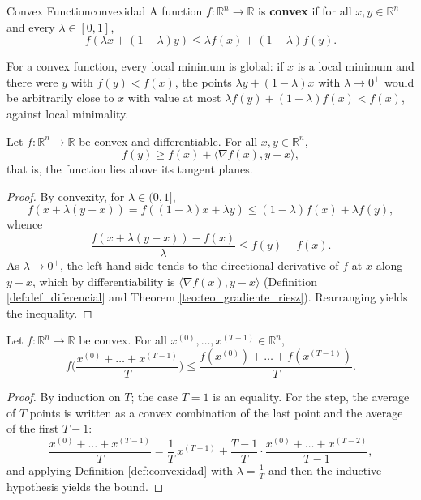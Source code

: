 \documentclass[11pt, a4paper]{article}
\begin{document}
\begin{definicion}{Convex Function}{convexidad}
A function $f: \mathbb{R}^n \to \mathbb{R}$ is \textbf{convex} if for all $x, y \in \mathbb{R}^n$ and every $\lambda \in [0, 1]$,
\[
f(\lambda x + (1 - \lambda) y) \le \lambda f(x) + (1 - \lambda) f(y).
\]
\end{definicion}

\obs For a convex function, every local minimum is global: if $x$ is a local minimum and there were $y$ with $f(y) < f(x)$, the points $\lambda y + (1-\lambda) x$ with $\lambda \to 0^+$ would be arbitrarily close to $x$ with value at most $\lambda f(y) + (1-\lambda) f(x) < f(x)$, against local minimality.

\begin{lema}\label{lem_tangente}
Let $f: \mathbb{R}^n \to \mathbb{R}$ be convex and differentiable. For all $x, y \in \mathbb{R}^n$,
\[
f(y) \ge f(x) + \langle \nabla f(x), y - x \rangle,
\]
that is, the function lies above its tangent planes.
\end{lema}

\begin{proof}
By convexity, for $\lambda \in (0, 1]$,
\[
f(x + \lambda (y - x)) = f((1-\lambda) x + \lambda y) \le (1 - \lambda) f(x) + \lambda f(y),
\]
whence
\[
\frac{f(x + \lambda (y - x)) - f(x)}{\lambda} \le f(y) - f(x).
\]
As $\lambda \to 0^+$, the left-hand side tends to the directional derivative of $f$ at $x$ along $y - x$, which by differentiability is $\langle \nabla f(x), y - x \rangle$ (Definition \ref{def:def_diferencial} and Theorem \ref{teo:teo_gradiente_riesz}). Rearranging yields the inequality.
\end{proof}

\begin{lema}\label{lem_jensen}
Let $f: \mathbb{R}^n \to \mathbb{R}$ be convex. For all $x^{(0)}, \dots, x^{(T-1)} \in \mathbb{R}^n$,
\[
f \Bigg( \frac{x^{(0)} + \dots + x^{(T-1)}}{T} \Bigg) \le \frac{f(x^{(0)}) + \dots + f(x^{(T-1)})}{T}.
\]
\end{lema}

\begin{proof}
By induction on $T$; the case $T = 1$ is an equality. For the step, the average of $T$ points is written as a convex combination of the last point and the average of the first $T - 1$:
\[
\frac{x^{(0)} + \dots + x^{(T-1)}}{T} = \frac{1}{T} \, x^{(T-1)} + \frac{T-1}{T} \cdot \frac{x^{(0)} + \dots + x^{(T-2)}}{T-1},
\]
and applying Definition \ref{def:convexidad} with $\lambda = \frac{1}{T}$ and then the inductive hypothesis yields the bound.
\end{proof}
\end{document}
